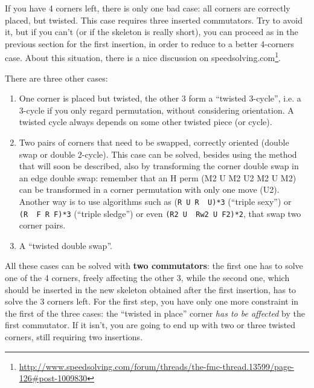 \documentclass[11pt,a4paper]{book}
\newcommand{\p}{\textquotesingle}
\newcommand{\m}{\texttt}
\newcommand{\ps}{\p\,\,}
\begin{document}
If you have 4 corners left, there is only one bad case: all corners are correctly placed, but twisted. This case requires three inserted commutators. Try to avoid it, but if you can't (or if the skeleton is really short), you can proceed as in the previous section for the first insertion, in order to reduce to a better 4-corners case. About this situation, there is a nice discussion on speedsolving.com\footnote{\url{http://www.speedsolving.com/forum/threads/the-fmc-thread.13599/page-126\#post-1009830}}.

There are three other cases:
\begin{enumerate}
\item One corner is placed but twisted, the other 3 form a ``twisted 3-cycle'', i.e. a 3-cycle if you only regard permutation, without considering orientation. A twisted cycle always depends on some other twisted piece (or cycle).
\item Two pairs of corners that need to be swapped, correctly oriented (double swap or double 2-cycle). This case can be solved, besides using the method that will soon be described, also by transforming the corner double swap in an edge double swap: remember that an H perm (M2 U M2 U2 M2 U M2) can be transformed in a corner permutation with only one move (U2). Another way is to use algorithms such as (\m{R U R\ps U\p)*3} (``triple sexy'') or \m{(R\ps F R F\p)*3} (``triple sledge'') or even \m{(R2 U\ps Rw2 U F2)*2}, that swap two corner pairs.
\item A ``twisted double swap''.
\end{enumerate}

All these cases can be solved with \textbf{two commutators}: the first one has to solve one of the 4 corners, freely affecting the other 3, while the second one, which should be inserted in the new skeleton obtained after the first insertion, has to solve the 3 corners left. For the first step, you have only one more constraint in the first of the three cases: the ``twisted in place'' corner \emph{has to be affected} by the first commutator. If it isn't, you are going to end up with two or three twisted corners, still requiring two insertions.
\end{document}
